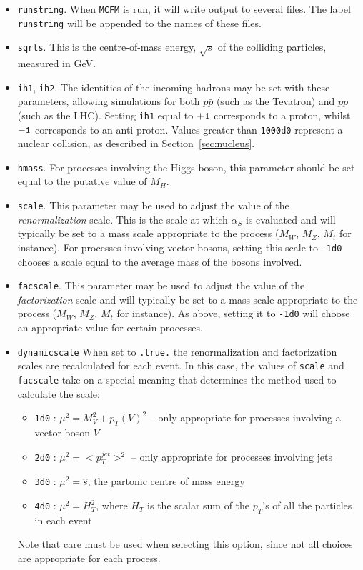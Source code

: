 \documentclass[12pt]{article}
\begin{document}
\begin{itemize}
\item {\tt runstring}.
When {\tt MCFM} is run, it will write output to several files. The
label {\tt runstring} will be appended to the names of these files.

\item {\tt sqrts}. This is the centre-of-mass energy, $\sqrt{s}$ of
the colliding particles, measured in GeV.

\item {\tt ih1}, {\tt ih2}. The identities of the incoming hadrons
may be set with these parameters, allowing simulations for both
$p{\bar p}$ (such as the Tevatron) and $pp$ (such as the LHC). 
Setting {\tt ih1} equal to ${\tt +1}$ corresponds to
a proton, whilst ${\tt -1}$ corresponds to an anti-proton.
Values greater than {\tt 1000d0} represent a nuclear collision,
as described in Section~\ref{sec:nucleus}.

\item {\tt hmass}. For processes involving the Higgs boson, this
parameter should be set equal to the putative value of $M_H$.

\item {\tt scale}. This parameter may be used to adjust the value
of the {\it renormalization} scale. This is the scale
at which $\alpha_S$ is evaluated and will typically be set to
a mass scale appropriate to the process ($M_W$, $M_Z$, $M_t$ for
instance). For processes involving vector bosons, setting this
scale to {\tt -1d0} chooses a scale equal to the average mass of
the bosons involved.

\item {\tt facscale}. This parameter may be used to adjust the value
of the {\it factorization} scale and will typically be set to
a mass scale appropriate to the process ($M_W$, $M_Z$, $M_t$ for
instance). As above, setting it to {\tt -1d0} will choose an
appropriate value for certain processes.

\item {\tt dynamicscale} When set to {\tt .true.} the renormalization and
factorization scales are recalculated for each event. In this case,
the values of {\tt scale} and {\tt facscale} take on a special meaning
that determines the method used to calculate the scale:
  \begin{itemize}
  \item {\tt 1d0} : $\mu^2 = M_V^2+p_T(V)^2$ -- only appropriate for
  processes involving a vector boson $V$
  \item {\tt 2d0} : $\mu^2 = <p_T^{jet}>^2$ -- only appropriate for
  processes involving jets
  \item {\tt 3d0} : $\mu^2 = \hat{s}$, the partonic centre of mass energy
  \item {\tt 4d0} : $\mu^2 = H_T^2$, where $H_T$ is the scalar sum of
  the $p_T$'s of all the particles in each event
  \end{itemize}
  Note that care must be used when selecting this option, since not
  all choices are appropriate for each process.


\end{itemize}
\end{document}
